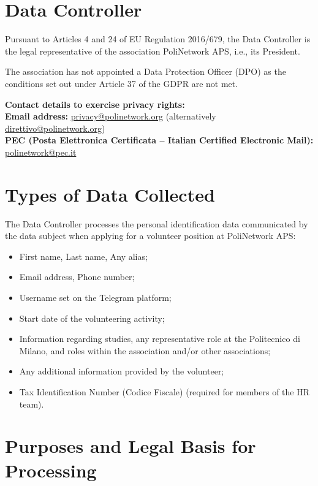 \documentclass[legal]{polinetwork}
\begin{document}
\pnMakeHeader

\section{Data Controller}

Pursuant to Articles 4 and 24 of EU Regulation 2016/679, the Data Controller is the legal representative of the association PoliNetwork APS, i.e., its President.

The association has not appointed a Data Protection Officer (DPO) as the conditions set out under Article 37 of the GDPR are not met.

\textbf{Contact details to exercise privacy rights:} \\

\textbf{Email address:} \href{mailto:privacy@polinetwork.org}{privacy@polinetwork.org} (alternatively \href{mailto:direttivo@polinetwork.org}{direttivo@polinetwork.org}) \\
\textbf{PEC (Posta Elettronica Certificata – Italian Certified Electronic Mail):} \href{mailto:polinetwork@pec.it}{polinetwork@pec.it}

\section{Types of Data Collected}

The Data Controller processes the personal identification data communicated by the data subject when applying for a volunteer position at PoliNetwork APS:

\begin{itemize}
	\item First name, Last name, Any alias;
	\item Email address, Phone number;
	\item Username set on the Telegram platform;
	\item Start date of the volunteering activity;
	\item Information regarding studies, any representative role at the Politecnico di Milano, and roles within the association and/or other associations;
	\item Any additional information provided by the volunteer;
	\item Tax Identification Number (Codice Fiscale) (required for members of the HR team).
\end{itemize}

\section{Purposes and Legal Basis for Processing}
\end{document}
